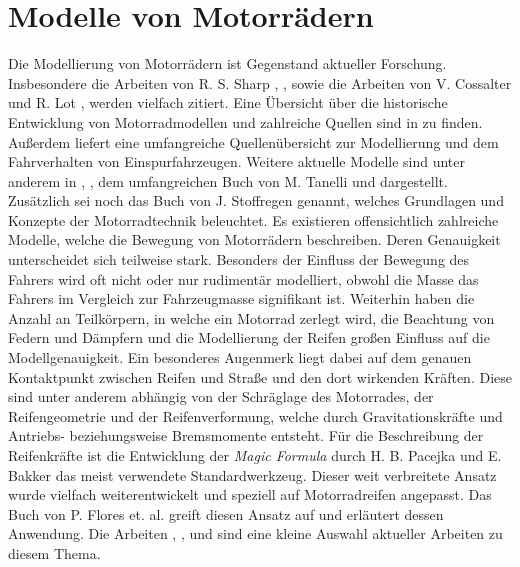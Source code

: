 \chapter{Modelle von Motorr\"adern}\label{ch:modell}
Die Modellierung von Motorr\"adern ist Gegenstand aktueller Forschung. Insbesondere die Arbeiten von R. S. Sharp \cite{Sharp1971}, \cite{SHARP1985}, \cite{Sharp2001} sowie die Arbeiten von V. Cossalter und R. Lot \cite{Cossalter2002}, \cite{Cossalter2010} werden vielfach zitiert. Eine \"Ubersicht \"uber die historische Entwicklung von Motorradmodellen und zahlreiche Quellen sind in \cite{Limebeer2006} zu finden. Au\ss{}erdem liefert \cite{Schwab2013} eine umfangreiche Quellen\"ubersicht zur Modellierung und dem Fahrverhalten von Einspurfahrzeugen. Weitere aktuelle Modelle sind unter anderem in \cite{Kanoh2007}, \cite{Nehaoua2013}, dem umfangreichen Buch von M. Tanelli \cite{MaraTanelli2014a} und \cite{Leonelli2015} dargestellt. Zus\"atzlich sei noch das Buch von J. Stoffregen \cite{Stoffregen2012} genannt, welches Grundlagen und Konzepte der Motorradtechnik beleuchtet.  \hfill \newline
Es existieren offensichtlich zahlreiche Modelle, welche die Bewegung von Motorr\"adern beschreiben. Deren Genauigkeit unterscheidet sich teilweise stark. Besonders der Einfluss der Bewegung des Fahrers wird oft nicht oder nur rudiment\"ar modelliert, obwohl die Masse das Fahrers im Vergleich zur Fahrzeugmasse signifikant ist. Weiterhin haben die Anzahl an Teilk\"orpern, in welche ein Motorrad zerlegt wird, die Beachtung von Federn und D\"ampfern und die Modellierung der Reifen gro\ss{}en Einfluss auf die Modellgenauigkeit. Ein besonderes Augenmerk liegt dabei auf dem genauen Kontaktpunkt zwischen Reifen und Stra\ss{}e und den dort wirkenden Kr\"aften. Diese sind unter anderem abh\"angig von der Schr\"aglage des Motorrades, der Reifengeometrie und der Reifenverformung, welche durch Gravitationskr\"afte und Antriebs- beziehungsweise Bremsmomente entsteht. F\"ur die Beschreibung der Reifenkr\"afte ist die Entwicklung der \textit{Magic Formula} durch H. B. Pacejka und E. Bakker \cite{Pacejka1992} das meist verwendete Standardwerkzeug. Dieser weit verbreitete Ansatz wurde vielfach weiterentwickelt und speziell auf Motorradreifen angepasst. Das Buch von P. Flores et. al. \cite{Gent2006} greift diesen Ansatz auf und erl\"autert dessen Anwendung.  Die Arbeiten \cite{Besselink2010}, \cite{Pacejka2012}, \cite{Redrouthu2014} und \cite{Lot2004} sind eine kleine Auswahl aktueller Arbeiten zu diesem Thema. \hfill \newline

